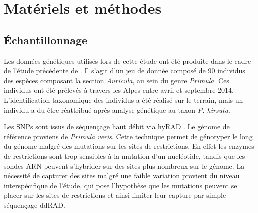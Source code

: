 
\section{Matériels et méthodes}

\subsection{Échantillonnage}

Les données génétiques utilisés lors de cette étude ont été produite dans le cadre de l'étude précédente de \citet{Boucher2016a}. 
Il s'agit d'un jeu de donnée composé de 90 individus des espèces composant la section \textit{Auricula}, au sein du genre \textit{Primula}. 
Ces individus ont été prélevés à travers les Alpes entre avril et septembre 2014. 
L'identification taxonomique des individus a été réalisé sur le terrain, mais un individu a du être réattribué après analyse génétique au taxon \textit{P. hirsuta}.

Les SNPs sont issus de séquençage haut débit via hyRAD \citep{Suchan2016}. 
Le génome de référence proviens de \textit{Primula veris}.
Cette technique permet de génotyper le long du génome malgré des mutations sur les sites de restrictions. 
En effet les enzymes de restrictions sont trop sensibles à la mutation d'un nucléotide, tandis que les sondes ARN peuvent s'hybrider sur des sites plus nombreux sur le génome. 
La nécessité de capturer des sites malgré une faible variation provient du niveau interspécifique de l'étude, qui pose l'hypothèse que les mutations peuvent se placer sur les sites de restrictions et ainsi limiter leur capture par simple séquençage ddRAD.

